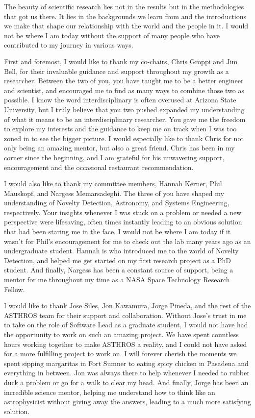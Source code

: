 The beauty of scientific research lies not in the results but in the methodologies that got us there. 
It lies in the backgrounds we learn from and the introductions we make that shape our relationship with the world and the people in it.
I would not be where I am today without the support of many people who have contributed to my journey in various ways.

First and foremost, I would like to thank my co-chairs, Chris Groppi and Jim Bell, for their invaluable guidance and support throughout my growth as a researcher.
Between the two of you, you have taught me to be a better engineer and scientist, and encouraged me to find as many ways to combine those two as possible.
I know the word interdisciplinary is often overused at Arizona State University, but I truly believe that you two pushed expanded my understanding of what it means to be an interdisciplinary researcher.
You gave me the freedom to explore my interests and the guidance to keep me on track when I was too zoned in to see the bigger picture.
I would especially like to thank Chris for not only being an amazing mentor, but also a great friend.
Chris has been in my corner since the beginning, and I am grateful for his unwavering support, encouragement and the occasional restaurant recommendation.

I would also like to thank my committee members, Hannah Kerner, Phil Mauskopf, and Nargess Memarsadeghi. 
The three of you have shaped my understanding of Novelty Detection, Astronomy, and Systems Engineering, respectively.
Your insights whenever I was stuck on a problem or needed a new perspective were lifesaving, often times instantly leading to an obvious solution that had been staring me in the face.
I would not be where I am today if it wasn't for Phil's encouragement for me to check out the lab many years ago as an undergraduate student.
Hannah is who introduced me to the world of Novelty Detection, and helped me get started on my first research project as a PhD student.
And finally, Nargess has been a constant source of support, being a mentor for me throughout my time as a NASA Space Technology Research Fellow.

I would like to thank Jose Siles, Jon Kawamura, Jorge Pineda, and the rest of the ASTHROS team for their support and collaboration.
Without Jose's trust in me to take on the role of Software Lead as a graduate student, I would not have had the opportunity to work on such an amazing project.
We have spent countless hours working together to make ASTHROS a reality, and I could not have asked for a more fulfilling project to work on.
I will forever cherish the moments we spent sipping margaritas in Fort Sumner to eating spicy chicken in Pasadena and everything in between.
Jon was always there to help whenever I needed to rubber duck a problem or go for a walk to clear my head.
And finally, Jorge has been an incredible science mentor, helping me understand how to think like an astrophysicist without giving away the answers, leading to a much more satisfying solution.

